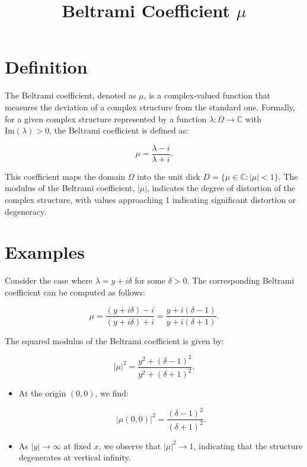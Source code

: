 \documentclass[11pt,a4paper]{article}
\title{Beltrami Coefficient $\mu$}
\date{}
\begin{document}
\maketitle
\section{Definition}
The Beltrami coefficient, denoted as $\mu$, is a complex-valued function that measures the deviation of a complex structure from the standard one. Formally, for a given complex structure represented by a function $\lambda: \Omega \to \mathbb{C}$ with $\text{Im}(\lambda) > 0$, the Beltrami coefficient is defined as:

\begin{equation}
\mu = \frac{\lambda - i}{\lambda + i}.
\end{equation}

This coefficient maps the domain $\Omega$ into the unit disk $D = \{ \mu \in \mathbb{C} : |\mu| < 1 \}$. The modulus of the Beltrami coefficient, $|\mu|$, indicates the degree of distortion of the complex structure, with values approaching 1 indicating significant distortion or degeneracy.

\section{Examples}
Consider the case where $\lambda = y + i\delta$ for some $\delta > 0$. The corresponding Beltrami coefficient can be computed as follows:

\begin{equation}
\mu = \frac{(y + i\delta) - i}{(y + i\delta) + i} = \frac{y + i(\delta - 1)}{y + i(\delta + 1)}.
\end{equation}

The squared modulus of the Beltrami coefficient is given by:

\begin{equation}
|\mu|^2 = \frac{y^2 + (\delta - 1)^2}{y^2 + (\delta + 1)^2}.
\end{equation}

\begin{itemize}
\item At the origin $(0, 0)$, we find:

\[
|\mu(0, 0)|^2 = \frac{(\delta - 1)^2}{(\delta + 1)^2}.
\]

\item As $|y| \to \infty$ at fixed $x$, we observe that $|\mu|^2 \to 1$, indicating that the structure degenerates at vertical infinity.
\end{itemize}
\end{document}
